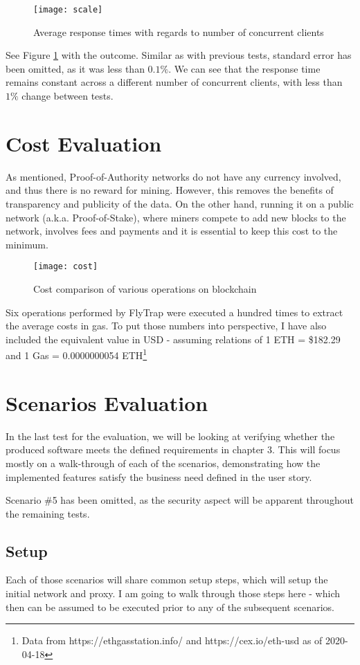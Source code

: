 \begin{figure}[h]
    \centering
    \texttt{[image: scale]}
    \caption{Average response times with regards to number of concurrent clients}
    \label{fig:scale}
\end{figure}
See Figure \ref{fig:scale} with the outcome. Similar as with previous tests, standard error has been omitted, as it was less than $0.1\%$. We can see that the response time remains constant across a different number of concurrent clients, with less than $1\%$ change between tests.

\section{Cost Evaluation}
As mentioned, Proof-of-Authority networks do not have any currency involved, and thus there is no reward for mining. However, this removes the benefits of transparency and publicity of the data. On the other hand, running it on a public network (a.k.a. Proof-of-Stake), where miners compete to add new blocks to the network, involves fees and payments and it is essential to keep this cost to the minimum.

\begin{figure}[h]
    \centering
    \texttt{[image: cost]}
    \caption{Cost comparison of various operations on blockchain}
    \label{fig:cost}
\end{figure}

Six operations performed by FlyTrap were executed a hundred times to extract the average costs in gas. To put those numbers into perspective, I have also included the equivalent value in USD - assuming relations of 1 ETH = \$182.29 and 1 Gas = 0.0000000054 ETH\footnote{Data from https://ethgasstation.info/ and https://cex.io/eth-usd as of 2020-04-18}


\section{Scenarios Evaluation}
In the last test for the evaluation, we will be looking at verifying whether the produced software meets the defined requirements in chapter 3. This will focus mostly on a walk-through of each of the scenarios, demonstrating how the implemented features satisfy the business need defined in the user story.

Scenario \#5 has been omitted, as the security aspect will be apparent throughout the remaining tests.
\subsection{Setup}
Each of those scenarios will share common setup steps, which will setup the initial network and proxy. I am going to walk through those steps here - which then can be assumed to be executed prior to any of the subsequent scenarios.
